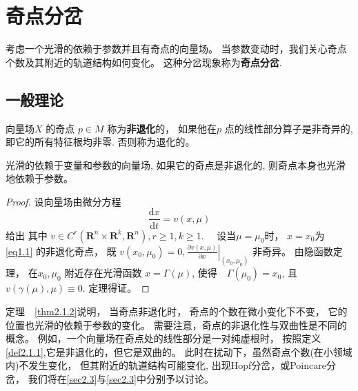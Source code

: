 \section{奇点分岔}
考虑一个光滑的依赖于参数并且有奇点的向量场。
当参数变动时，我们关心奇点个数及其附近的轨道结构如何变化。
这种分岔现象称为\textbf{奇点分岔}.
\subsection{一般理论}
\begin{defination}\label{def2.1.1}
  向量场\(X\) 的奇点 \( p \in M \) 称为\textbf{非退化}的，
  如果他在\(p\) 点的线性部分算子是非奇异的,
  即它的所有特征根均非零.
  否则称为退化的。
  \label{def2.1.1}
\end{defination}

\begin{theorem}\label{thm2.1.2}
  光滑的依赖于变量和参数的向量场,
  如果它的奇点是非退化的,
  则奇点本身也光滑地依赖于参数。
  \label{thm2.1.2}
\end{theorem}

\begin{proof}
  设向量场由微分方程
  \begin{equation}
    \frac{\mathrm{d} x}{\mathrm{d} t}=v(x, \mu)
    \label{eq1.1}
  \end{equation}
  给出
  其中
  \(v \in C^{r}\left(\mathbf{R}^{n} \times \mathbf{R}^{k}, \mathbf{R}^{n}\right), r \geqslant 1, k \geqslant 1  \).
  　设当\(\mu = \mu_{0}\)时，
  \(x=x_{0}\)为　\ref{eq1.1}
  的非退化奇点，
  既
  \(
  v\left(x_{0}, \mu_{0}\right)=0,\left.\frac{\partial v(x, \mu)}{\partial x}\right|_{\left(x_{0}, \mu_{0}\right)}
  \)
  非奇异。
  由隐函数定理，
  在\(x_{0},\mu_{0}\) 附近存在光滑函数
  \(x= \Gamma (\mu)\),
  使得　\(\Gamma ( \mu_{0}) = x_{0}\),
  且
  \(
v(\gamma(\mu), \mu) \equiv 0
  \).
  定理得证。
\end{proof}

\begin{remark}
  \label{rmk2.1.3}
  定理　\ref{thm2.1.2}说明，
  当奇点非退化时，
  奇点的个数在微小变化下不变，
  它的位置也光滑的依赖于参数的变化。
  需要注意，奇点的非退化性与双曲性是不同的概念。
  例如，一个向量场在奇点处的线性部分是一对纯虚根时，
  按照定义\ref{def2.1.1},它是非退化的，但它是双曲的。
  此时在扰动下，虽然奇点个数(在小领域内)不发生变化，
  但其附近的轨道结构可能变化,
  出现Hopf分岔，或Poincare分岔，
  我们将在\ref{sec2.3}与\ref{sec2.3}中分别予以讨论。
\end{remark}

